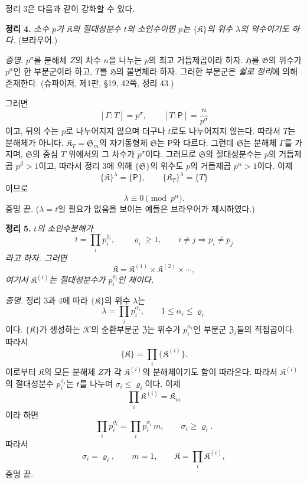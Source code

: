 정리 3은 다음과 같이 강화할 수 있다.

\textbf{정리 4.} \emph{소수 \(p\)가 \(\mathfrak K\)의 절대성분수 \(t\)의 소인수이면 \(p\)는 \(\{\mathfrak K\}\)의 위수 \(\lambda\)의 약수이기도 하다.} (브라우어.)

\emph{증명.} \(p^\sigma\)를 분해체 \(Z\)의 차수 \(n\)을 나누는 \(p\)의 최고 거듭제곱이라 하자. \(\mathfrak H\)를 \(\mathfrak G\)의 위수가 \(p^\sigma\)인 한 부분군이라 하고, \(T\)를 \(\mathfrak H\)의 불변체라 하자. 그러한 부분군은 \emph{쉴로 정리}에 의해 존재한다. (슈파이저, 제1판, §19, 42쪽, 정리 43.)

그러면
\[
        [\Gamma:T]=p^\sigma,
        \qquad
        [T:\mathsf P]=\frac{n}{p^\sigma}
\]
이고, 뒤의 수는 \(p\)로 나누어지지 않으며 더구나 \(t\)로도 나누어지지 않는다. 따라서 \(T\)는 분해체가 아니다. \(\mathfrak K_T=\mathfrak S_m\)의 자기동형체 \(\mathfrak S\)는 \(\mathsf P\)와 다르다. 그런데 \(\mathfrak S\)는 분해체 \(\Gamma\)를 가지며, \(\mathfrak S\)의 중심 \(T\) 위에서의 그 차수가 \(p^\sigma\)이다. 그러므로 \(\mathfrak S\)의 절대성분수는 \(p\)의 거듭제곱 \(p^\beta>1\)이고, 따라서 정리 3에 의해 \(\{\mathfrak S\}\)의 위수도 \(p\)의 거듭제곱 \(p^\alpha>1\)이다. 이제
\[
        \{\mathfrak K\}^{\lambda}=\{\mathsf P\},
        \qquad
        \{\mathfrak K_T\}^{\lambda}=\{T\}
\]
이므로
\[
        \lambda\equiv0\pmod {p^\alpha}.
\]
증명 끝. (\(\lambda=t\)일 필요가 없음을 보이는 예들은 브라우어가 제시하였다.)

\textbf{정리 5.} \emph{\(t\)의 소인수분해가}
\[
        t=\prod_i p_i^{\varrho_i},
        \qquad
        \varrho_i\geq1,
        \qquad
        i\ne j\Longrightarrow p_i\ne p_j
\]
\emph{라고 하자. 그러면}
\[
        \mathfrak K
        =\mathfrak K^{(1)}\times
         \mathfrak K^{(2)}\times\cdots,
\]
\emph{여기서 \(\mathfrak K^{(i)}\)는 절대성분수가 \(p_i^{\varrho_i}\)인 체이다.}

\emph{증명.} 정리 3과 4에 따라 \(\{\mathfrak K\}\)의 위수 \(\lambda\)는
\[
        \lambda=\prod_i p_i^{\alpha_i},
        \qquad
        1\leq\alpha_i\leq\varrho_i
\]
이다. \(\{\mathfrak K\}\)가 생성하는 \(\mathscr K\)의 순환부분군 \(\mathfrak Z\)는 위수가 \(p_i^{\alpha_i}\)인 부분군 \(\mathfrak Z_i\)들의 직접곱이다. 따라서
\[
        \{\mathfrak K\}
        =\prod_i\{\mathfrak K^{(i)}\}.
\]
이로부터 \(\mathfrak K\)의 모든 분해체 \(Z\)가 각 \(\mathfrak K^{(i)}\)의 분해체이기도 함이 따라온다. 따라서 \(\mathfrak K^{(i)}\)의 절대성분수 \(p_i^{\sigma_i}\)는 \(t\)를 나누며 \(\sigma_i\leq\varrho_i\)이다. 이제
\[
        \prod_i\mathfrak K^{(i)}=\mathfrak K_m
\]
이라 하면
\[
        \prod_i p_i^{\varrho_i}
        =\prod_i p_i^{\sigma_i}\,m,
        \qquad
        \sigma_i\geq\varrho_i.
\]
따라서
\[
        \sigma_i=\varrho_i,
        \qquad
        m=1,
        \qquad
        \mathfrak K=\prod_i\mathfrak K^{(i)},
\]
증명 끝.

